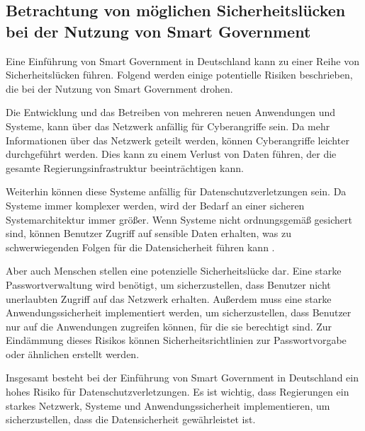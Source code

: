 \subsection{Betrachtung von möglichen Sicherheitslücken bei der Nutzung von Smart Government}
Eine Einführung von Smart Government in Deutschland kann zu einer Reihe von Sicherheitslücken führen. 
Folgend werden einige potentielle Risiken beschrieben, die bei der Nutzung von Smart Government drohen.
\par
Die Entwicklung und das Betreiben von mehreren neuen Anwendungen und Systeme, kann über das Netzwerk anfällig für Cyberangriffe sein. 
Da mehr Informationen über das Netzwerk geteilt werden, können Cyberangriffe leichter durchgeführt werden. 
Dies kann zu einem Verlust von Daten führen, der die gesamte Regierungsinfrastruktur beeinträchtigen kann.
\par
Weiterhin können diese Systeme anfällig für Datenschutzverletzungen sein. 
Da Systeme immer komplexer werden, wird der Bedarf an einer sicheren Systemarchitektur immer größer. 
Wenn Systeme nicht ordnungsgemäß gesichert sind, können Benutzer Zugriff auf sensible Daten erhalten, was zu schwerwiegenden Folgen für die Datensicherheit führen kann \citep[Vgl.][]{von_Lucke_2016}.
\par
Aber auch Menschen stellen eine potenzielle Sicherheitslücke dar. 
Eine starke Passwortverwaltung wird benötigt, um sicherzustellen, dass Benutzer nicht unerlaubten Zugriff auf das Netzwerk erhalten. 
Außerdem muss eine starke Anwendungssicherheit implementiert werden, um sicherzustellen, dass Benutzer nur auf die Anwendungen zugreifen können, für die sie berechtigt sind.
Zur Eindämmung dieses Risikos können Sicherheitsrichtlinien zur Passwortvorgabe oder ähnlichen erstellt werden.
\par
Insgesamt besteht bei der Einführung von Smart Government in Deutschland ein hohes Risiko für Datenschutzverletzungen. 
Es ist wichtig, dass Regierungen ein starkes Netzwerk, Systeme und Anwendungssicherheit implementieren, um sicherzustellen, dass die Datensicherheit gewährleistet ist.